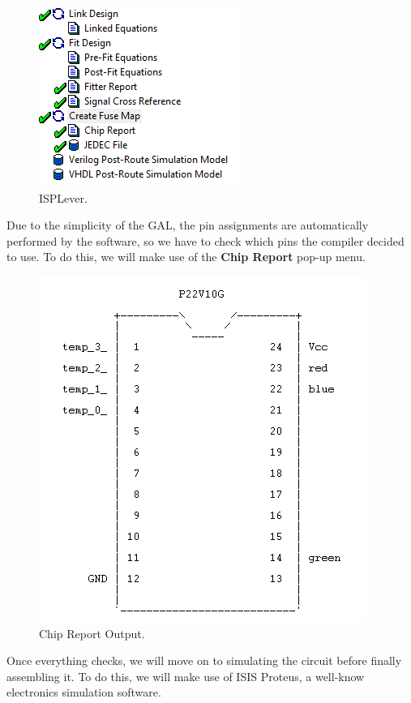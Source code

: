 \documentclass[a4paper, 11pt, oneside]{article}
\begin{document}
\begin{figure}[H]
    \centering
    \includegraphics[scale = 0.85]{Graphics/Practice 1/ISPLever.PNG}
    \caption{ISPLever.}
    \label{fig:ISPLever}
\end{figure}

Due to the simplicity of the GAL, the pin assignments are automatically performed by the software, so we have to check which pins the compiler decided to use. To do this, we will make use of the \textbf{Chip Report} pop-up menu.

\begin{figure}[H]
    \centering
    \includegraphics[scale=0.7]{Graphics/Practice 1/Chip_Report.PNG}
    \caption{Chip Report Output.}
    \label{fig:CHIP_REPORT}
\end{figure}

\newpage

Once everything checks, we will move on to simulating the circuit before finally assembling it. To do this, we will make use of ISIS Proteus, a well-know electronics simulation software.\medskip
\end{document}
